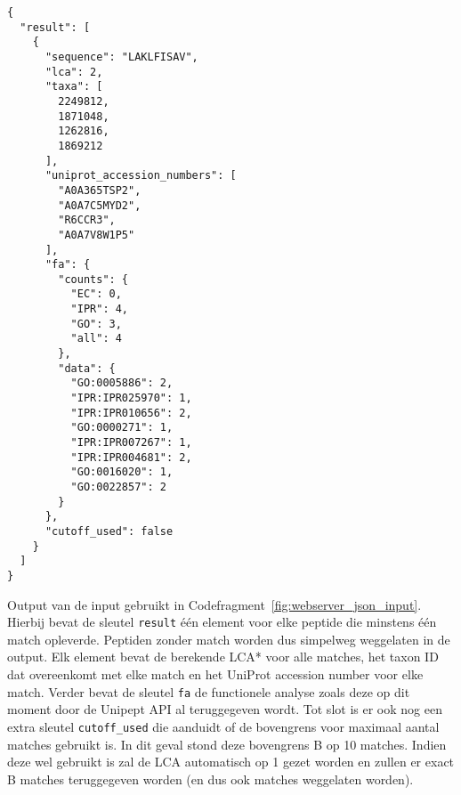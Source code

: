 \begin{listing}[h!]
    \begin{verbatim}
{
  "result": [
    {
      "sequence": "LAKLFISAV",
      "lca": 2,
      "taxa": [
        2249812,
        1871048,
        1262816,
        1869212
      ],
      "uniprot_accession_numbers": [
        "A0A365TSP2",
        "A0A7C5MYD2",
        "R6CCR3",
        "A0A7V8W1P5"
      ],
      "fa": {
        "counts": {
          "EC": 0,
          "IPR": 4,
          "GO": 3,
          "all": 4
        },
        "data": {
          "GO:0005886": 2,
          "IPR:IPR025970": 1,
          "IPR:IPR010656": 2,
          "GO:0000271": 1,
          "IPR:IPR007267": 1,
          "IPR:IPR004681": 2,
          "GO:0016020": 1,
          "GO:0022857": 2
        }
      },
      "cutoff_used": false
    }
  ]
}
    \end{verbatim}
    \caption{Output van de input gebruikt in Codefragment~\ref{fig:webserver_json_input}.
    Hierbij bevat de sleutel \texttt{result} één element voor elke peptide die minstens één match opleverde.
    Peptiden zonder match worden dus simpelweg weggelaten in de output.
    Elk element bevat de berekende LCA* voor alle matches, het taxon ID dat overeenkomt met elke match en het UniProt accession number voor elke match.
    Verder bevat de sleutel \texttt{fa} de functionele analyse zoals deze op dit moment door de Unipept API al teruggegeven wordt.
    Tot slot is er ook nog een extra sleutel \texttt{cutoff\_used} die aanduidt of de bovengrens voor maximaal aantal matches gebruikt is.
    In dit geval stond deze bovengrens B op 10 matches.
    Indien deze wel gebruikt is zal de LCA automatisch op 1 gezet worden en zullen er exact B matches teruggegeven worden (en dus ook matches weggelaten worden).}
    \label{fig:webserver_json_output}
\end{listing}

